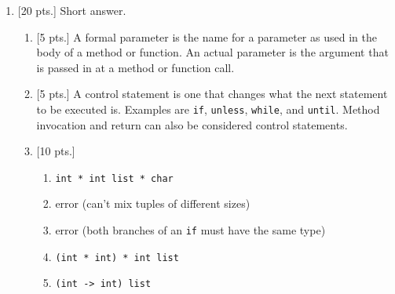 \documentclass[11pt]{article}
\begin{document}
  \showinfo


  \begin{enumerate}

    \addtolength{\itemsep}{10mm}

    \item {[20 pts.]} Short answer.

          \vspace{-1.5mm}

          \begin{enumerate}

            \addtolength{\itemsep}{2mm}

            \item {{[5 pts.]}} A formal parameter is the name for a parameter
                  as used in the body of a method or function.  An actual
                  parameter is the argument that is passed in at a method or
                  function call.

            \item {{[5 pts.]}} A control statement is one that changes what
                  the next statement to be executed is.  Examples are
                  \texttt{if}, \texttt{unless}, \texttt{while}, and
                  \texttt{until}.  Method invocation and return can also be
                  considered control statements.

            \item {{[10 pts.]}}

                  \begin{enumerate}

                    \addtolength{\itemsep}{2mm}

                    \item \texttt{int * int list * char}

                    \item error (can't mix tuples of different sizes)

                    \item error (both branches of an \texttt{if} must have
                          the same type)

                    \item \texttt{(int * int) * int list}

                    \item \texttt{(int -> int) list}

                  \end{enumerate}


\end{enumerate}
\end{enumerate}
\end{document}
